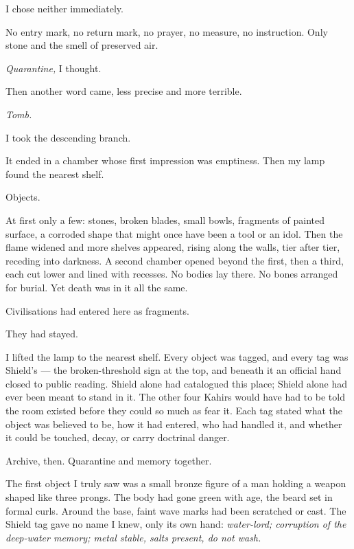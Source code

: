 I chose neither immediately.\par

No entry mark, no return mark, no prayer, no measure, no instruction. Only stone and the smell of preserved air.\par

\textit{Quarantine,} I thought.\par

Then another word came, less precise and more terrible.\par

\textit{Tomb.}\par

I took the descending branch.\par

It ended in a chamber whose first impression was emptiness. Then my lamp found the nearest shelf.\par

Objects.\par

At first only a few: stones, broken blades, small bowls, fragments of painted surface, a corroded shape that might once have been a tool or an idol. Then the flame widened and more shelves appeared, rising along the walls, tier after tier, receding into darkness. A second chamber opened beyond the first, then a third, each cut lower and lined with recesses. No bodies lay there. No bones arranged for burial. Yet death was in it all the same.\par

Civilisations had entered here as fragments.\par

They had stayed.\par

I lifted the lamp to the nearest shelf. Every object was tagged, and every tag was Shield's --- the broken-threshold sign at the top, and beneath it an official hand closed to public reading. Shield alone had catalogued this place; Shield alone had ever been meant to stand in it. The other four Kahirs would have had to be told the room existed before they could so much as fear it. Each tag stated what the object was believed to be, how it had entered, who had handled it, and whether it could be touched, decay, or carry doctrinal danger.\par

Archive, then. Quarantine and memory together.\par

The first object I truly saw was a small bronze figure of a man holding a weapon shaped like three prongs. The body had gone green with age, the beard set in formal curls. Around the base, faint wave marks had been scratched or cast. The Shield tag gave no name I knew, only its own hand: \textit{water-lord; corruption of the deep-water memory; metal stable, salts present, do not wash.}\par

